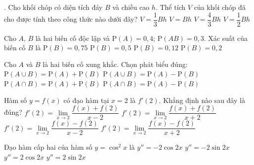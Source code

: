 \begin{ex}.%
Cho khối chóp có diện tích đáy $B$ và chiều cao $h$. Thể tích $V$ của khối chóp đã cho được tính theo công thức nào dưới đây?
\choice
{\True $V=\dfrac{1}{3}Bh$}
{$V=Bh$}
{$V=\dfrac{4}{3}Bh$}
{$V=\dfrac{1}{2}Bh$}
\end{ex}

\begin{ex}%
Cho $A$, $ B$ là hai biến cố độc lập và $\mathrm{P}(A)=0{,}4$; $ \mathrm{P}(AB)=0{,}3$. Xác suất của biến cố $B$ là
\choice
{\True $\mathrm{P}(B)=0{,}75$}
{$\mathrm{P}(B)=0{,}5$}
{$\mathrm{P}(B)=0{,}12$}
{$\mathrm{P}(B)=0{,}2$}
\end{ex}

\begin{ex}%
Cho $A$ và $B$ là hai biến cố xung khắc. Chọn phát biểu đúng:
\choice
{\True $\mathrm{P}(A \cup B) = \mathrm{P}(A) + \mathrm{P}(B)$}
{$\mathrm{P}(A \cup B) = \mathrm{P}(A) - \mathrm{P}(B)$}
{$\mathrm{P}(A \cap B) = \mathrm{P}(A) + \mathrm{P}(B)$}
{$\mathrm{P}(A \cap B) = \mathrm{P}(A) - \mathrm{P}(B)$}
\end{ex}

\begin{ex}%
Hàm số $y=f(x)$ có đạo hàm tại $x=2$ là $f'(2)$. Khẳng định nào sau đây là đúng?
\choice
{$f'(2) = \lim\limits_{x\to 2}\dfrac{f(x)+f(2)}{x-2}$}
{$f'(2) = \lim\limits_{x\to 2}\dfrac{f(x)+f(2)}{x+2}$}
{\True $f'(2) = \lim\limits_{x\to 2}\dfrac{f(x)-f(2)}{x-2}$}
{$f'(2) = \lim\limits_{x\to 2}\dfrac{f(x)-f(2)}{x+2}$}
\end{ex}

\begin{ex}%
Đạo hàm cấp hai của hàm số $y=\cos^2x$ là
\choice
{\True  $ y'' =-2\cos 2x$}
{$ y'' =-2\sin 2x$}
{$ y'' =2\cos 2x$}
{$ y'' =2\sin 2x$}
\end{ex}

